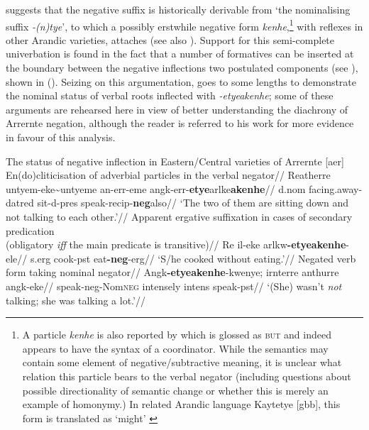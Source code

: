 \documentclass[usenames,dvipsnames,11pt]{article}
\begin{document}
{\citet[235, fn 17]{Wilkins1989} suggests that the negative suffix is historically derivable from `the nominalising suffix \textit{-(n)tye}', to which a possibly erstwhile negative form \textit{kenhe},\footnote{A particle \textit{kenhe} is also reported by \citet[372]{Wilkins1989} which is glossed as \textsc{but} and indeed appears to have the syntax of a coordinator. While the semantics may contain some element of negative/subtractive meaning, it is unclear what relation this particle bears to the verbal negator (including questions about possible directionality of semantic change or whether this is merely an example of homonymy.) In related Arandic language Kaytetye [\gls{gbb}], this form is translated as `might' \citep[424]{KaytetyeDict}} with reflexes in other Arandic varieties, attaches (see also \citealt[275]{Yallop1977}). Support for this semi-complete univerbation is found in the fact that a number of formatives can be inserted at the boundary between the negative inflections two postulated components (see \citealt[378\textit{ff}]{Wilkins1989}), shown in (). Seizing on this argumentation, \citet[411-26]{Henderson2013} goes to some lengths to demonstrate the nominal status of verbal roots inflected with \textit{-etye\textdblhyphen akenhe}; some of these arguments are rehearsed here in view of better understanding the diachrony of Arrernte negation, although the reader is referred to his work for more evidence in favour of this analysis.

\pex The status of negative inflection in Eastern/Central varieties of Arrernte [\gls{aer}]
	\a\begingl\glpreamble En(do)cliticisation of adverbial particles in the verbal negator//
	\gla Re\textdblhyphen atherre untyem-eke\textasciitilde untyeme an-err-eme angk-err-\textbf{etye}\guillemotleft arlke\guillemotright \textbf{akenhe}//
		\gls{d}.\gls{nom} facing.away-\gls{dat}\textdblhyphen\gls{red} sit-\gls{d}-\gls{pres} speak-\gls{recip}-\textbf{\gls{neg}}\guillemotleft also\guillemotright//
		\glft`The two of them are sitting down and not talking to each other.'//
		\endgl
	\a\begingl\glpreamble Apparent ergative suffixation in cases of secondary predication\\(obligatory \textsl{iff} the main predicate is transitive)//
		\gla Re il-eke arlkw\textbf{-etye\textdblhyphen akenhe}-ele//
		\gls{s}.\gls{erg} cook-\gls{pst} eat\textbf{-\gls{neg}}-\gls{erg}//
		\glft`S/he cooked without eating.'//\endgl
		\a\begingl\glpreamble Negated verb form taking nominal negator//
		\gla Angk\textbf{-etye\textdblhyphen akenhe}-kwenye; irnterre anthurre angk-eke//
		\glb speak-\gls{neg}-Nom\textsc{neg} intensely \gls{intens} speak-\gls{pst}//
		\glft`(She) wasn't \textit{not} talking; she was talking a lot.'//\endgl
\xe

}
\end{document}

